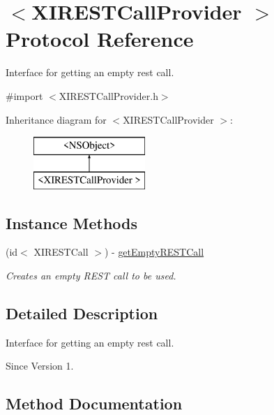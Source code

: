 \hypertarget{protocol_x_i_r_e_s_t_call_provider_01-p}{}\section{$<$X\+I\+R\+E\+S\+T\+Call\+Provider $>$ Protocol Reference}
\label{protocol_x_i_r_e_s_t_call_provider_01-p}


Interface for getting an empty rest call.  




{\ttfamily \#import $<$X\+I\+R\+E\+S\+T\+Call\+Provider.\+h$>$}

Inheritance diagram for $<$X\+I\+R\+E\+S\+T\+Call\+Provider $>$\+:\begin{figure}[H]
\begin{center}
\leavevmode
\includegraphics[height=2.000000cm]{protocol_x_i_r_e_s_t_call_provider_01-p}
\end{center}
\end{figure}
\subsection*{Instance Methods}
\begin{DoxyCompactItemize}
\item 
(id$<$ X\+I\+R\+E\+S\+T\+Call $>$) -\/ \hyperlink{protocol_x_i_r_e_s_t_call_provider_01-p_a74c21e40938139c3517bfb3bfd8bb0ed}{get\+Empty\+R\+E\+S\+T\+Call}
\begin{DoxyCompactList}\small\item\em Creates an empty R\+E\+ST call to be used. \end{DoxyCompactList}\end{DoxyCompactItemize}


\subsection{Detailed Description}
Interface for getting an empty rest call. 

\begin{DoxySince}{Since}
Version 1. 
\end{DoxySince}


\subsection{Method Documentation}
\hypertarget{protocol_x_i_r_e_s_t_call_provider_01-p_a74c21e40938139c3517bfb3bfd8bb0ed}{}\label{protocol_x_i_r_e_s_t_call_provider_01-p_a74c21e40938139c3517bfb3bfd8bb0ed} 
